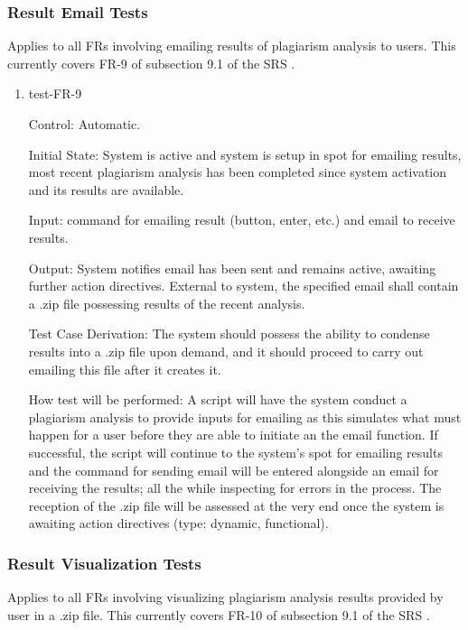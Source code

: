\documentclass[12pt, titlepage]{article}
\begin{document}
\subsubsection{Result Email Tests}

Applies to all FRs involving emailing results of plagiarism analysis to users. 
This currently covers FR-9 of subsection 9.1 of the SRS \citep{SRS}.

\begin{enumerate}

\item{test-FR-9\\}

Control: Automatic.
					
Initial State: System is active and system is setup in spot for emailing results,
most recent plagiarism analysis has been completed since system activation and 
its results are available.
					
Input: command for emailing result (button, enter, etc.) and email to 
receive results.
					
Output: System notifies email has been sent and remains active, awaiting 
further action directives. External to system, the specified email shall
contain a .zip file possessing results of the recent analysis.

Test Case Derivation: The system should possess the ability to condense results
into a .zip file upon demand, and it should proceed to carry out emailing this 
file after it creates it.

How test will be performed: A script will have the system conduct a 
plagiarism analysis to provide inputs for emailing as this
simulates what must happen for a user before they are able to initiate an
the email function. If successful, the script will continue to the system's spot 
for emailing results and the command for sending email will be entered alongside 
an email for receiving the results; all the while inspecting for errors in the 
process. The reception of the .zip file will be assessed at the very end once 
the system is awaiting action directives (type: dynamic, functional).
					

\end{enumerate}

\subsubsection{Result Visualization Tests}

Applies to all FRs involving visualizing plagiarism analysis results provided 
by user in a .zip file. This currently covers FR-10 of subsection 9.1 of the SRS 
\citep{SRS}.
\end{document}
